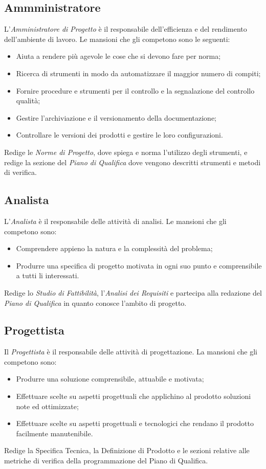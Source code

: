 \subsection{Ammministratore}
L'\textit{Amministratore di Progetto} è il responsabile dell'efficienza e del rendimento dell'ambiente di lavoro. Le mansioni che gli competono sono le seguenti:
\begin{itemize}
	\item Aiuta a rendere più agevole le cose che si devono fare per norma;
	\item Ricerca di strumenti in modo da automatizzare il maggior numero di compiti;
	\item Fornire procedure e strumenti per il controllo e la segnalazione del controllo qualità;
	\item Gestire l'archiviazione e il versionamento della documentazione;
	\item Controllare le versioni dei prodotti e gestire le loro configurazioni.
\end{itemize}
Redige le \textit{Norme di Progetto}, dove spiega e norma l'utilizzo degli strumenti, e redige la sezione del \textit{Piano di Qualifica} dove vengono descritti strumenti e metodi di verifica.
\subsection{Analista}
L'\textit{Analista} è il responsabile delle attività di analisi. Le mansioni che gli competono sono:
\begin{itemize}
	\item Comprendere appieno la natura e la complessità del problema;
	\item Produrre una specifica di progetto motivata in ogni suo punto e comprensibile a tutti li interessati.
\end{itemize}
Redige lo \textit{Studio di Fattibilità}, l'\textit{Analisi dei Requisiti} e partecipa alla redazione del \textit{Piano di Qualifica} in quanto conosce l'ambito di progetto.

\subsection{Progettista}
Il \textit{Progettista} è il responsabile delle attività di progettazione. La mansioni che gli competono sono:
\begin{itemize}
	\item Produrre una soluzione comprensibile, attuabile e motivata;
	\item Effettuare scelte su aspetti progettuali che applichino al prodotto soluzioni note ed ottimizzate;
	\item Effettuare scelte su aspetti progettuali e tecnologici che rendano il prodotto facilmente manutenibile.
\end{itemize}
Redige la Specifica Tecnica, la Definizione di Prodotto e le sezioni relative alle metriche di verifica della programmazione del Piano di Qualifica.

